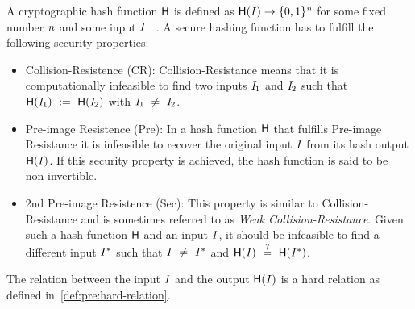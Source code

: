 \begin{definition}\label{def:pre:hash-function}
    A cryptographic hash function $\mathsf{H}$ is defined as $\mathsf{H} (\mathit{I}) \rightarrow \{0,1\}^{\mathit{n}}$ for some fixed number $\mathit{n}$ and some input $\mathit{I}$ ~\cite{al2011cryptographic}.
    A secure hashing function has to fulfill the following security properties:
    \begin{itemize}
        \item Collision-Resistence (CR): Collision-Resistance means that it is computationally infeasible to find two inputs $\mathit{I}_1$ and $\mathit{I}_2$ such that
        $\mathsf{H} (\mathit{I}_1) ~:=~ \mathsf{H} (\mathit{I}_2)$ with $\mathit{I}_1 ~\neq~ \mathit{I}_2$.
        \item Pre-image Resistence (Pre): In a hash function $\mathsf{H}$ that fulfills Pre-image Resistance it is infeasible to recover the original input $\mathit{I}$ from its hash output $\mathsf{H} (\mathit{I})$.
        If this security property is achieved, the hash function is said to be non-invertible.
        \item 2nd Pre-image Resistence (Sec):  This property is similar to Collision-Resistance and is sometimes referred to as \textit{Weak Collision-Resistance}.
        Given such a hash function $\mathsf{H}$ and an input $\mathit{I}$, it should be infeasible to find a different input $\mathit{I}^*$ such that $\mathit{I} ~\neq~ \mathit{I}^*$
        and $\mathsf{H} (\mathit{I}) ~\stackrel{?}{=}~ \mathsf{H} (\mathit{I}^*)$.
    \end{itemize}
    The relation between the input $\mathit{I}$ and the output $\mathsf{H} (\mathit{I})$ is a hard relation as defined in~\ref{def:pre:hard-relation}.
\end{definition}

